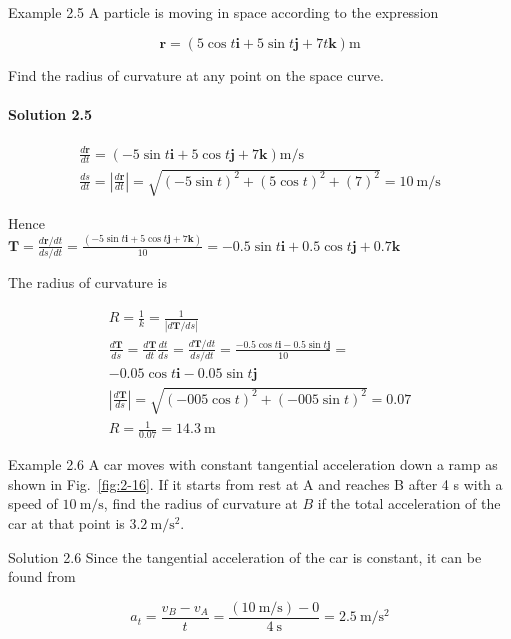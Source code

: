 \documentclass[10pt]{article}
\numberwithin{equation}{section}
\begin{document}
Example 2.5 A particle is moving in space according to the expression

$$
\mathbf{r}=(5 \cos t \mathbf{i}+5 \sin t \mathbf{j}+7 t \mathbf{k}) \mathrm{m}
$$

Find the radius of curvature at any point on the space curve.

\paragraph*{Solution 2.5}
$$
\begin{gathered}
\frac{d \mathbf{r}}{d t}=(-5 \sin t \mathbf{i}+5 \cos t \mathbf{j}+7 \mathbf{k}) \mathrm{m} / \mathrm{s} \\
\frac{d s}{d t}=\left|\frac{d \mathbf{r}}{d t}\right|=\sqrt{(-5 \sin t)^{2}+(5 \cos t)^{2}+(7)^{2}}=10 \mathrm{~m} / \mathrm{s}
\end{gathered}
$$

Hence\\
$\mathbf{T}=\frac{d \mathbf{r} / d t}{d s / d t}=\frac{(-5 \sin t \mathbf{i}+5 \cos t \mathbf{j}+7 \mathbf{k})}{10}=-0.5 \sin t \mathbf{i}+0.5 \cos t \mathbf{j}+0.7 \mathbf{k}$

The radius of curvature is

$$
\begin{gathered}
R=\frac{1}{k}=\frac{1}{|d \mathbf{T} / d s|} \\
\frac{d \mathbf{T}}{d s}=\frac{d \mathbf{T}}{d t} \frac{d t}{d s}=\frac{d \mathbf{T} / d t}{d s / d t}=\frac{-0.5 \cos t \mathbf{i}-0.5 \sin t \mathbf{j}}{10}= \\
-0.05 \cos t \mathbf{i}-0.05 \sin t \mathbf{j} \\
\left|\frac{d \mathbf{T}}{d s}\right|=\sqrt{(-005 \cos t)^{2}+(-005 \sin t)^{2}}=0.07 \\
R=\frac{1}{0.07}=14.3 \mathrm{~m}
\end{gathered}
$$

Example 2.6 A car moves with constant tangential acceleration down a ramp as shown in Fig.~\ref{fig:2-16}. If it starts from rest at A and reaches B after 4 s with a speed of $10 \mathrm{~m} / \mathrm{s}$, find the radius of curvature at $B$ if the total acceleration of the car at that point is $3.2 \mathrm{~m} / \mathrm{s}^{2}$.

Solution 2.6 Since the tangential acceleration of the car is constant, it can be found from

$$
a_{t}=\frac{v_{B}-v_{A}}{t}=\frac{(10 \mathrm{~m} / \mathrm{s})-0}{4 \mathrm{~s}}=2.5 \mathrm{~m} / \mathrm{s}^{2}
$$
\end{document}
